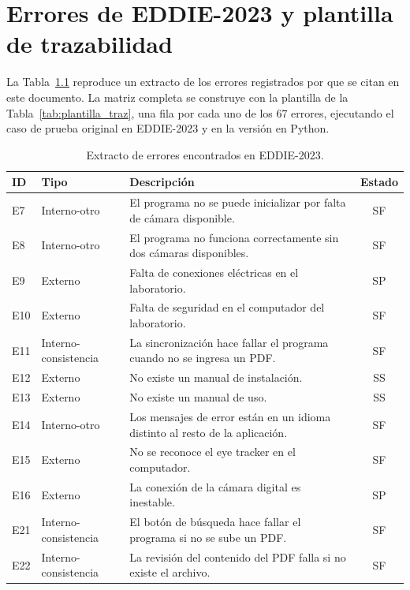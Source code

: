 
\chapter{Errores de EDDIE-2023 y plantilla de trazabilidad}
\label{an:errores}

La Tabla~\ref{tab:extracto_errores} reproduce un extracto de los errores registrados por \citet{ibaceta2023evaluacion} que se citan en este documento. La matriz completa se construye con la plantilla de la Tabla~\ref{tab:plantilla_traz}, una fila por cada uno de los 67 errores, ejecutando el caso de prueba original en EDDIE-2023 y en la versión en Python.

\begin{table}[H]
\centering
\caption{Extracto de errores encontrados en EDDIE-2023.}
\label{tab:extracto_errores}
\footnotesize
\begin{tabularx}{\textwidth}{l l X c}
\toprule
\textbf{ID} & \textbf{Tipo} & \textbf{Descripción} & \textbf{Estado} \\ \midrule
E7 & Interno-otro & El programa no se puede inicializar por falta de cámara disponible. & SF \\
E8 & Interno-otro & El programa no funciona correctamente sin dos cámaras disponibles. & SF \\
E9 & Externo & Falta de conexiones eléctricas en el laboratorio. & SP \\
E10 & Externo & Falta de seguridad en el computador del laboratorio. & SF \\
E11 & Interno-consistencia & La sincronización hace fallar el programa cuando no se ingresa un PDF. & SF \\
E12 & Externo & No existe un manual de instalación. & SS \\
E13 & Externo & No existe un manual de uso. & SS \\
E14 & Interno-otro & Los mensajes de error están en un idioma distinto al resto de la aplicación. & SF \\
E15 & Externo & No se reconoce el eye tracker en el computador. & SF \\
E16 & Externo & La conexión de la cámara digital es inestable. & SP \\
E21 & Interno-consistencia & El botón de búsqueda hace fallar el programa si no se sube un PDF. & SF \\
E22 & Interno-consistencia & La revisión del contenido del PDF falla si no existe el archivo. & SF \\

\end{tabularx}
\end{table}

